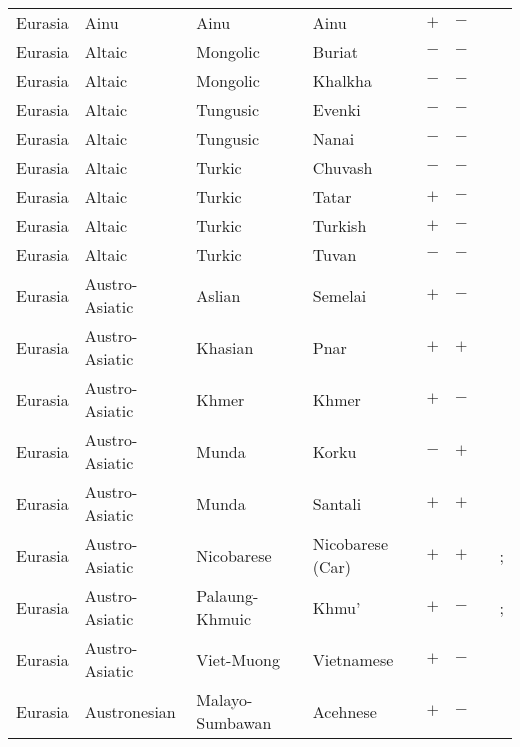 \begin{landscape}
\begin{longtable}{l>{\raggedright\arraybackslash}p{2.2cm}>{\raggedright}p{2.5cm}>{\raggedright\arraybackslash}p{2.5cm}cc>{\raggedright\arraybackslash}p{3.4cm}>{\raggedright\arraybackslash}p{3.4cm}}
Eurasia & Ainu & Ainu & Ainu & $+$ & $-$ & \citealt{Gil2013} & \citealt{Corbett2013}\\
Eurasia & Altaic & Mongolic & Buriat & $-$ & $-$ & \citealt{Gil2013} & \citealt[110--111, 117--120]{Skribnik2003}\\
Eurasia & Altaic & Mongolic & Khalkha & $-$ & $-$ & \citealt{Gil2013} & \citealt{Corbett2013}\\
Eurasia & Altaic & Tungusic & Evenki & $-$ & $-$ & \citealt{Gil2013} & \citealt{Corbett2013}\\
Eurasia & Altaic & Tungusic & Nanai & $-$ & $-$ & \citealt{Gil2013} & \citealt[297]{Nichols1992}\\
Eurasia & Altaic & Turkic & Chuvash & $-$ & $-$ & \citealt{Gil2013} & \citealt{Corbett2013}\\
Eurasia & Altaic & Turkic & Tatar & $+$ & $-$ & \citealt{Gil2013} & \citealt[29--57]{Poppe1968}\\
Eurasia & Altaic & Turkic & Turkish & $+$ & $-$ & \citealt{Gil2013} & \citealt{Corbett2013}\\
Eurasia & Altaic & Turkic & Tuvan & $-$ & $-$ & \citealt{Gil2013} & \citealt[297]{Nichols1992}\\
Eurasia & Austro-Asiatic & Aslian & Semelai & $+$ & $-$ & \citealt{Gil2013} & \citealt{Corbett2013}\\
Eurasia & Austro-Asiatic & Khasian & Pnar & $+$ & $+$ & \citealt[124--125, 357--369]{Ring2015} & \citealt[101, 107--108]{Ring2015}\\
Eurasia & Austro-Asiatic & Khmer & Khmer & $+$ & $-$ & \citealt{Gil2013} & \citealt{Corbett2013}\\
Eurasia & Austro-Asiatic & Munda & Korku & $-$ & $+$ & \citealt{Gil2013} & \citealt[passim]{Bhattacharya1976}\\
Eurasia & Austro-Asiatic & Munda & Santali & $+$ & $+$ & \citealt{Gil2013} & \citealt[11--12, 32--33, 39--40, 44--45]{Ghosh2008}\\
Eurasia & Austro-Asiatic & Nicobarese & Nicobarese (Car) & $+$ & $+$ & \citealt{Gil2013} & \citealt{Corbett2013}; \citealt[103--108]{Braine1970}\\
Eurasia & Austro-Asiatic & Palaung-Khmuic & Khmu' & $+$ & $-$ & \citealt{Gil2013} & \citealt{Corbett2013}; \citealt[30, 32--33]{Premsrirat1987}\\
Eurasia & Austro-Asiatic & Viet-Muong & Vietnamese & $+$ & $-$ & \citealt{Gil2013} & \citealt{Corbett2013}\\
Eurasia & Austronesian & Malayo-Sumbawan & Acehnese & $+$ & $-$ & \citealt[137--139]{Durie1985}& \citealt[29]{Durie1985}\\

\end{longtable}
\end{landscape}
